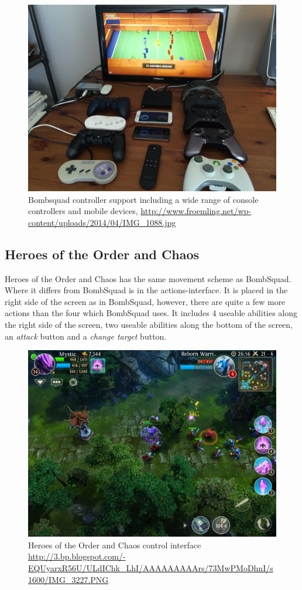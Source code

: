 \begin{figure}[h!]
\centering
\includegraphics[width=1\textwidth]{figures/analysis/controlscheme/controller_support}
\caption{Bombsquad controller support including a wide range of console controllers and mobile devices, \url{http://www.froemling.net/wp-content/uploads/2014/04/IMG_1088.jpg}}
\end{figure}

\subsection*{Heroes of the Order and Chaos}
Heroes of the Order and Chaos has the same movement scheme as BombSquad. 
Where it differs from BombSquad is in the actions-interface.
It is placed in the right side of the screen as in BombSquad, however, there are quite a few more actions than the four which BombSquad uses.
It includes 4 useable abilities along the right side of the screen, two useable abilities along the bottom of the screen, an \emph{attack} button and a \emph{change target} button.
\begin{figure}[h]
\centering
\includegraphics[width=1\textwidth]{figures/analysis/controlscheme/hotoac_control}
\caption{Heroes of the Order and Chaos control interface \url{http://3.bp.blogspot.com/-EQUyarxR56U/ULdIChk_LhI/AAAAAAAAArs/73MwPMoDhnI/s1600/IMG_3227.PNG}}
\end{figure}

